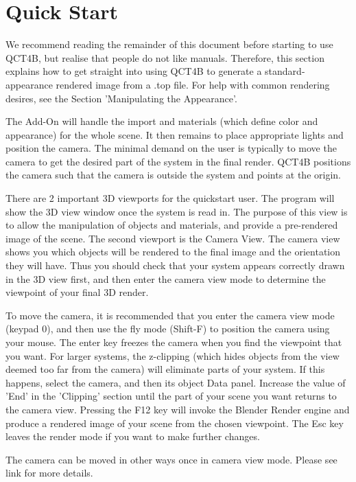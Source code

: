 \documentclass{report}
\begin{document}
\section{Quick Start}

We recommend reading the remainder of this document before starting to use QCT4B, but realise that people do 
not like manuals.
Therefore, this section explains how to get straight into using QCT4B to generate a standard-appearance rendered 
image from a .top file.
For help with common rendering desires, see the Section 'Manipulating the Appearance'.

The Add-On will handle the import and materials (which define color and appearance) for the whole scene.
It then remains to place appropriate lights and position the camera.
The minimal demand on the user is typically to move the camera to get the desired part of the system in the final 
render.
QCT4B positions the camera such that the camera is outside the system and points at the origin.

There are 2 important 3D viewports for the quickstart user. The program will show the 3D view window once the 
system is read in.
The purpose of this view is to allow the manipulation of objects and materials, and provide a pre-rendered image 
of the scene.
The second viewport is the Camera View. The camera view shows you which objects will be rendered to the final image 
and the orientation they will have.
Thus you should check that your system appears correctly drawn in the 3D view first, and then enter the camera 
view mode to determine the viewpoint of your final 3D render.

To move the camera, it is recommended that you enter the camera view mode (keypad 0), and then use the fly mode 
(Shift-F) to position the camera using your mouse.
The enter key freezes the camera when you find the viewpoint that you want.
For larger systems, the z-clipping (which hides objects from the view deemed too far from the camera) will 
eliminate parts of your system.
If this happens, select the camera, and then its object Data panel.
Increase the value of 'End' in the 'Clipping' section until the part of your scene you want returns to the camera view.
Pressing the F12 key will invoke the Blender Render engine and produce a rendered image of your scene from the 
chosen viewpoint.
The Esc key leaves the render mode if you want to make further changes.

The camera can be moved in other ways once in camera view mode. Please see link for more details.
\end{document}
